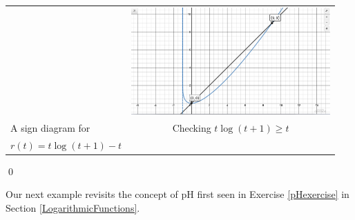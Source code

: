 \documentclass{ximera}
\begin{document}
\begin{ex}
\begin{enumerate}
\begin{center}
\begin{tabular}{m{2in}c}
& 


\includegraphics[width=3in]{./LogarithmicEquationsandInequalitiesGraphics/LogEqnEx09.jpg} \\

A sign diagram for   
&

Checking $t \log(t+1) \geq t$ \\

$r(t) = t \log(t+1)  - t $ & \\


\end{tabular}

\end{center}

\qed
\end{enumerate}
\end{ex}

\smallskip

Our next example revisits the concept of pH first seen in Exercise \ref{pHexercise} in Section \ref{LogarithmicFunctions}.  
\end{document}
